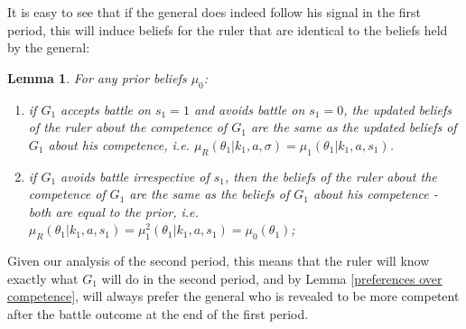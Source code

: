 \documentclass[11pt,]{article}
\newtheorem{lemma}[]{Lemma}
\begin{document}
It is easy to see that if the general does indeed follow his signal in the first period, this will induce beliefs for the ruler that are identical to the beliefs held by the general:



\begin{lemma}For any prior beliefs $\mu_0$:
\begin{enumerate}
\item if $G_1$ accepts battle on $s_1=1$ and avoids battle on $s_1=0$, the updated beliefs of the ruler about the competence of $G_1$ are the same as the updated beliefs of $G_1$ about his competence, i.e. $\mu_R(\theta_{1}|k_1,a,\sigma)=\mu_{1}(\theta_{1}|k_1,a,s_1)$.
\item if $G_1$ avoids battle irrespective of $s_1$, then the beliefs of the ruler about the competence of $G_1$ are the same as the beliefs of $G_1$ about his competence -  both are equal to the prior, i.e. $\mu_R(\theta_{1}|k_1,a,s_1)=\mu_1^2(\theta_{1}|k_1,a,s_1)=\mu_0(\theta_1)$; 
\end{enumerate}
\label{beliefs2}
\end{lemma}\noindent Given our analysis of the second period, this means that the ruler will know exactly what $G_1$ will do in the second period, and by Lemma \ref{preferences over competence}, will always prefer the general who is revealed to be more competent after the battle outcome at the end of the first period.


\end{document}
